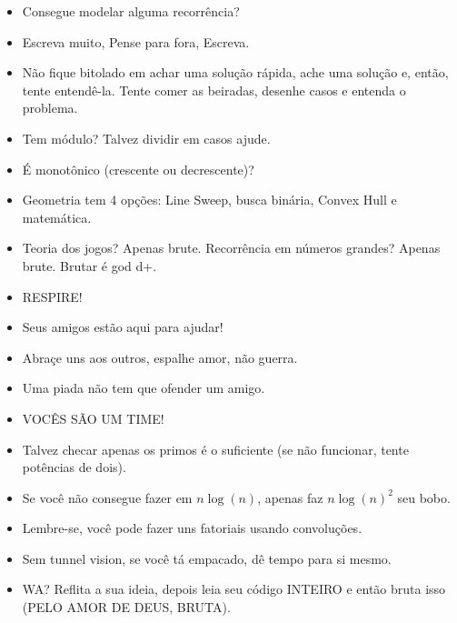 \begin{itemize}
    \item Consegue modelar alguma recorrência?

    \item Escreva muito, Pense para fora, Escreva.

    \item Não fique bitolado em achar uma solução rápida, ache uma solução e, então, tente entendê-la. Tente comer as beiradas, desenhe casos e entenda o problema.

    \item Tem módulo? Talvez dividir em casos ajude.

    \item É monotônico (crescente ou decrescente)?
    
    \item Geometria tem 4 opções: Line Sweep, busca binária, Convex Hull e matemática.

    \item Teoria dos jogos? Apenas brute. Recorrência em números grandes? Apenas brute. Brutar é god d+.
    
    \item RESPIRE!
    
    \item Seus amigos estão aqui para ajudar!
    
    \item Abraçe uns aos outros, espalhe amor, não guerra.
    
    \item Uma piada não tem que ofender um amigo.
    
    \item VOCÊS SÃO UM TIME!
    
    \item Talvez checar apenas os primos é o suficiente (se não funcionar, tente potências de dois).

    \item Se você não consegue fazer em $n\log(n)$, apenas faz $n \log(n)^2$ seu bobo.
    
    \item Lembre-se, você pode fazer uns fatoriais usando convoluções.

    \item Sem tunnel vision, se você tá empacado, dê tempo para si mesmo.

    \item WA? Reflita a sua ideia, depois leia seu código INTEIRO e então bruta isso (PELO AMOR DE DEUS, BRUTA).
    
    \end{itemize}
